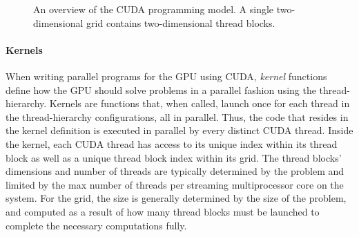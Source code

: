 \begin{figure}[H]
\begin{center}
{
}
\caption{An overview of the CUDA programming model. A single two-dimensional grid contains two-dimensional thread blocks.}
\label{figure:background:graphical_processing_units:cuda-model}
\end{center}
\end{figure}

\paragraph{Kernels}
When writing parallel programs for the GPU using CUDA, \textit{kernel} functions define how the GPU should solve problems in a parallel fashion using the thread-hierarchy.
Kernels are functions that, when called, launch once for each thread in the thread-hierarchy configurations, all in parallel.
Thus, the code that resides in the kernel definition is executed in parallel by every distinct CUDA thread.
Inside the kernel, each CUDA thread has access to its unique index within its thread block as well as a unique thread block index within its grid.
The thread blocks' dimensions and number of threads are typically determined by the problem and limited by the max number of threads per streaming multiprocessor core on the system.
For the grid, the size is generally determined by the size of the problem, and computed as a result of how many thread blocks must be launched to complete the necessary computations fully.


